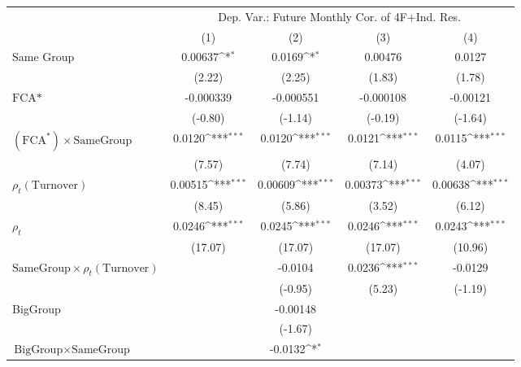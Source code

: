 {
\def\sym#1{\ifmmode^{#1}\else\(^{#1}\)\fi}
\begin{tabular}{l*{4}{c}}
\hline\hline
                &\multicolumn{4}{c}{Dep. Var.: Future Monthly Cor.  of 4F+Ind. Res.}        \\\cmidrule(lr){2-5}
                &\multicolumn{1}{c}{(1)}         &\multicolumn{1}{c}{(2)}         &\multicolumn{1}{c}{(3)}         &\multicolumn{1}{c}{(4)}         \\
\hline
Same Group      &  0.00637\sym{*}  &   0.0169\sym{*}  &  0.00476         &   0.0127         \\
                &   (2.22)         &   (2.25)         &   (1.83)         &   (1.78)         \\
[1em]
$ \text{FCA*} $ &-0.000339         &-0.000551         &-0.000108         & -0.00121         \\
                &  (-0.80)         &  (-1.14)         &  (-0.19)         &  (-1.64)         \\
[1em]
 $ (\text{FCA}^*) \times {\text{SameGroup} }  $ &   0.0120\sym{***}&   0.0120\sym{***}&   0.0121\sym{***}&   0.0115\sym{***}\\
                &   (7.57)         &   (7.74)         &   (7.14)         &   (4.07)         \\
[1em]
 $ {\rho_t(\text{Turnover})} $ &  0.00515\sym{***}&  0.00609\sym{***}&  0.00373\sym{***}&  0.00638\sym{***}\\
                &   (8.45)         &   (5.86)         &   (3.52)         &   (6.12)         \\
[1em]
 $ {\rho_t} $   &   0.0246\sym{***}&   0.0245\sym{***}&   0.0246\sym{***}&   0.0243\sym{***}\\
                &  (17.07)         &  (17.07)         &  (17.07)         &  (10.96)         \\
[1em]
$ {\text{SameGroup} \times  {\rho_t(\text{Turnover})} } $ &                  &  -0.0104         &   0.0236\sym{***}&  -0.0129         \\
                &                  &  (-0.95)         &   (5.23)         &  (-1.19)         \\
[1em]
BigGroup        &                  & -0.00148         &                  &                  \\
                &                  &  (-1.67)         &                  &                  \\
[1em]
$ {\text{BigGroup} } \times {\text{SameGroup} }  $ &                  &  -0.0132\sym{*}  &                  &                  \\

\end{tabular}}
